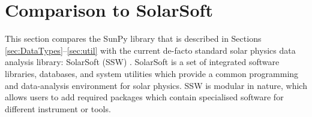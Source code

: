 \section{Comparison to SolarSoft}\label{sec:ssw}
This section compares the SunPy library that is described in Sections 
\ref{sec:DataTypes}--\ref{sec:util} with the current de-facto standard solar 
physics data analysis library: SolarSoft (SSW) \citep{ssw}.
SolarSoft is a set of integrated software libraries, databases, and system 
utilities which provide a common programming and data-analysis environment for 
solar physics. SSW is modular in nature, which allows users to add required 
packages which contain specialised software for different instrument or tools.


